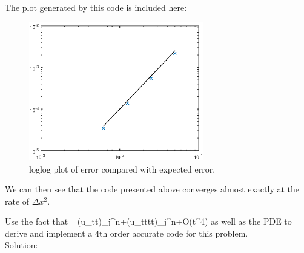 The plot generated by this code is included here:
\begin{figure}[h]
\centering
\includegraphics[width=3in]{convStudy}
\caption{loglog plot of error compared with expected error.}
\end{figure}
We can then see that the code presented above converges almost exactly at the rate of $\Delta x^2$.
\pagebreak
\item Use the fact that 
\bq {}=(u_{tt})_j^n+(u_{tttt})_j^n+O(\Delta t^4)\eq
as well as the PDE to derive and implement a 4th order accurate code for this problem.\\

Solution:\\

